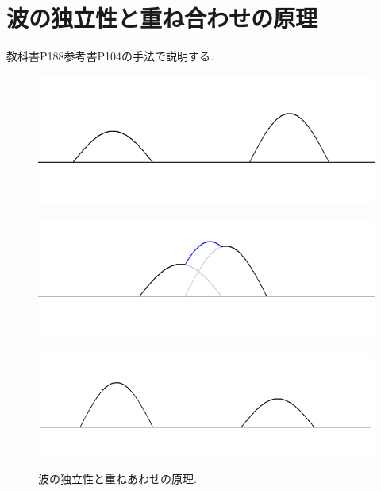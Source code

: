 \section{波の独立性と重ね合わせの原理}
教科書P188参考書P104の手法で説明する.


\begin{figure}[htbp]
\begin{minipage}[b]{1.0\linewidth}
\centering
\includegraphics[keepaspectratio, scale=0.45]
  {../background/synwave1.png}
 \label{synwave1}
 \end{minipage}
 
\begin{minipage}[b]{1.0\linewidth}
\centering
  \includegraphics[keepaspectratio, scale=0.45]
  {../background/synwave2.png}
 \label{synwave2}
 \end{minipage}
  
  \begin{minipage}[b]{1.0\linewidth}
\centering
  \includegraphics[keepaspectratio, scale=0.45]
  {../background/synwave3.png}
 \label{synwave3}
 \end{minipage}
  
  \caption{波の独立性と重ねあわせの原理.}
 \label{fig:synwave}
\end{figure}




